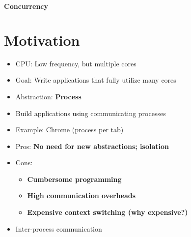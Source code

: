 \documentclass[a4paper,11pt,english]{article}
\begin{document}


\begin{center}
    \Large{\textbf{Concurrency}}
\end{center}

\section*{Motivation}
\begin{itemize}
    \item CPU: Low frequency, but multiple cores
    \item Goal: Write applications that fully utilize many cores
    \item Abstraction: \textbf{\color{blue} Process}
    \item Build applications using communicating processes
    \item Example: Chrome (process per tab)
    \item Pros: \textbf{\color{blue} No need for new abstractions; isolation}
    \item Cons:
        \begin{itemize}
            \item \textbf{\color{red} Cumbersome programming}
            \item \textbf{\color{red} High communication overheads}
            \item \textbf{\color{red} Expensive context switching (why expensive?)} 
        \end{itemize}
    \item Inter-process communication
\end{itemize}
\end{document}
